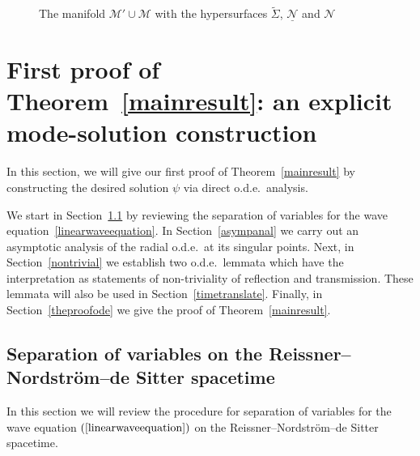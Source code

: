 \documentclass[A4,10pt]{article}
\begin{document}
\begin{figure}
\begin{center}
\end{center}
\caption{The manifold $\mathcal{M}'\cup\mathcal{M}$ with the hypersurfaces $\widetilde\Sigma$, $\mathcal{\underline{N}}$ and $\mathcal{N}$}\label{fig4}
\end{figure}


\section{First proof of Theorem~\ref{mainresult}: an explicit mode-solution construction}\label{modes}
In this section, we will give our first proof of Theorem~\ref{mainresult} by constructing the desired solution $\psi$ via direct o.d.e.~analysis. 

We start in Section~\ref{sepvar} by reviewing the separation of variables for the wave equation~\eqref{linearwaveequation}. In Section~\ref{asympanal} we carry out an asymptotic analysis of the radial o.d.e.~at its singular points. Next, in Section~\ref{nontrivial} we establish two o.d.e.~lemmata which have the interpretation as statements of non-triviality of reflection and transmission. These lemmata will also be used in Section~\ref{timetranslate}. Finally, in Section~\ref{theproofode} we give the proof of Theorem~\ref{mainresult}.

\subsection{Separation of variables on the Reissner--Nordstr\"{o}m--de Sitter spacetime}\label{sepvar}
In this section we will review the procedure for separation of variables for the wave equation
$(\ref{linearwaveequation})$ on the Reissner--Nordstr\"{o}m--de Sitter spacetime.
\end{document}
